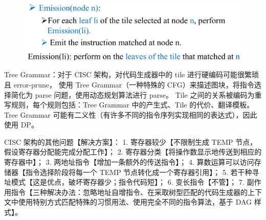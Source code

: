 \begin{figure}[H]
    \centering
    \includegraphics[width=0.8\linewidth]{figures/is2.png}
\end{figure}

\par \noindent Tree Grammar：对于 CISC 架构，对代码生成器中的 tile 进行硬编码可能很繁琐且 error-prune，
使用 Tree Grammar（一种特殊的 CFG）来描述图块，将指令选择简化为 parse 问题，使用动态规划算法进行 parse。
Tile 之间的关系被编码为重写规则，每个规则包括：Tree Grammar 中的产生式、Tile 的代价、翻译模板。
Tree Grammar 可能有二义性（有许多不同的指令序列实现相同的表达式），因此使用 DP。

\par \noindent CISC 架构的其他问题【解决方案】：
1. 寄存器较少【不限制生成 TEMP 节点，假设寄存器分配能完成分配工作】；
2. 寄存器分类【将操作数显示地传送到相应的寄存器中】；
3. 两地址指令【增加一条额外的传送指令】；
4. 算数运算可以访问存储器【指令选择阶段将每一个 TEMP 节点转化成一个寄存器引用】；
5. 若干种寻址模式【这是优点，破坏寄存器少；指令代码短】；
6. 变长指令【不管】；
7. 副作用指令【三种解决办法：忽略地址自增指令、在采取树型匹配的代码生成器的上下文中使用特别方式匹配特殊的习惯用法、使用完全不同的指令算法，基于 DAG 样式】。
